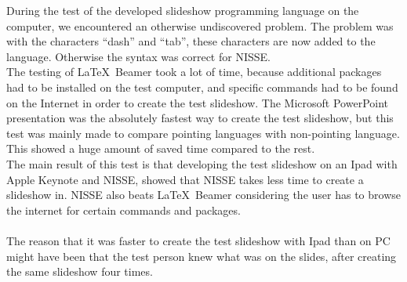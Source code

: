 During the test of the developed slideshow programming language on the computer, we encountered an otherwise undiscovered problem. The problem was with the characters ``dash'' and ``tab'', these characters are now added to the language. Otherwise the syntax was correct for NISSE.\\
The testing of \LaTeX~Beamer took a lot of time, because additional packages had to be installed on the test computer, and specific commands had to be found on the Internet in order to create the test slideshow.
The Microsoft PowerPoint presentation was the absolutely fastest way to create the test slideshow, but this test was mainly made to compare pointing languages with non-pointing language. This showed a huge amount of saved time compared to the rest. \\
The main result of this test is that developing the test slideshow on an Ipad with Apple Keynote and NISSE, showed that NISSE takes less time to create a slideshow in. NISSE also beats \LaTeX~Beamer considering the user has to browse the internet for certain commands and packages.
\\ \\
The reason that it was faster to create the test slideshow with Ipad than on PC might have been that the test person knew what was on the slides, after creating the same slideshow four times.